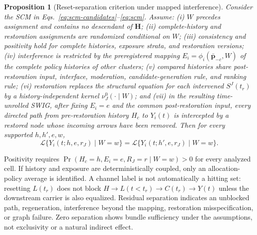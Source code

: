 \documentclass[pdflatex,sn-mathphys-num]{sn-jnl}
\newtheorem{proposition}{Proposition}
\begin{document}
\begin{proposition}[Reset-separation criterion under mapped interference]
\label{prop:reset-separation}
Consider the SCM in Eqs.~\eqref{eq:scm-candidates}--\eqref{eq:scm}. Assume: (i) $W$ precedes assignment and contains no descendant of $\bm H$; (ii) complete-history and restoration assignments are randomized conditional on $W$; (iii) consistency and positivity hold for complete histories, exposure strata, and restoration versions; (iv) interference is restricted by the preregistered mapping $E_i=\phi_i(\bm{\bar p}_{-c},W)$ of the complete policy histories of other clusters; (v) compared histories share post-restoration input, interface, moderation, candidate-generation rule, and ranking rule; (vi) restoration replaces the structural equation for each intervened $S^J(t_r)$ by a history-independent kernel $\nu_J^0(\cdot\mid W)$; and (vii) in the resulting time-unrolled SWIG, after fixing $E_i=e$ and the common post-restoration input, every directed path from pre-restoration history $H_c$ to $Y_i(t)$ is intercepted by a restored node whose incoming arrows have been removed. Then for every supported $h,h',e,w$,
\begin{equation}
\mathcal L\{Y_i(t;h,e,r_J)\mid W=w\}
=\mathcal L\{Y_i(t;h',e,r_J)\mid W=w\}.
\label{eq:reset-separation}
\end{equation}
\end{proposition}

Positivity requires $\Pr(H_c=h,E_i=e,R_J=r\mid W=w)>0$ for every analyzed cell. If history and exposure are deterministically coupled, only an allocation-policy average is identified. A channel label is not automatically a hitting set: resetting $L(t_r)$ does not block $H\rightarrow L(t<t_r)\rightarrow C(t_r)\rightarrow Y(t)$ unless the downstream carrier is also equalized. Residual separation indicates an unblocked path, regeneration, interference beyond the mapping, restoration misspecification, or graph failure. Zero separation shows bundle sufficiency under the assumptions, not exclusivity or a natural indirect effect.
\end{document}
